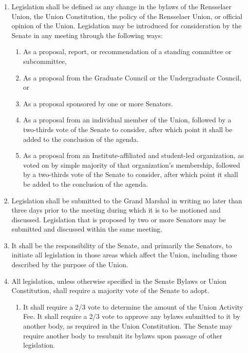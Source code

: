 
\begin{enumerate}
\item Legislation shall be defined as any change in the bylaws of the Rensselaer Union, the Union Constitution, the policy of the Rensselaer Union, or official opinion of the Union. Legislation may be introduced for consideration by the Senate in any meeting through the following ways:
  \begin{enumerate}
  \item As a proposal, report, or recommendation of a standing committee or subcommittee,
  \item As a proposal from the Graduate Council or the Undergraduate Council, or
  \item As a proposal sponsored by one or more Senators.
  \item As a proposal from an individual member of the Union, followed by a two-thirds vote of the Senate to consider, after which point it shall be added to the conclusion of the agenda.
  \item As a proposal from an Institute-affiliated and student-led organization, as voted on by simple majority of that organization’s membership, followed by a two-thirds vote of the Senate to consider, after which point it shall be added to the conclusion of the agenda.
  \end{enumerate}
\item Legislation shall be submitted to the Grand Marshal in writing no later than three days prior to the meeting during which it is to be motioned and discussed. Legislation that is proposed by two or more Senators may be submitted and discussed within the same meeting.
\item It shall be the responsibility of the Senate, and primarily the Senators, to initiate all legislation in those areas which affect the Union, including those described by the purpose of the Union.
\item All legislation, unless otherwise specified in the Senate Bylaws or Union Constitution, shall require a majority vote of the Senate to adopt.
  \begin{enumerate}
  \item It shall require a 2/3 vote to determine the amount of the Union Activity Fee. It shall require a 2/3 vote to approve any bylaws submitted to it by another body, as required in the Union Constitution. The Senate may require another body to resubmit its bylaws upon passage of other legislation.

\end{enumerate}
\end{enumerate}

